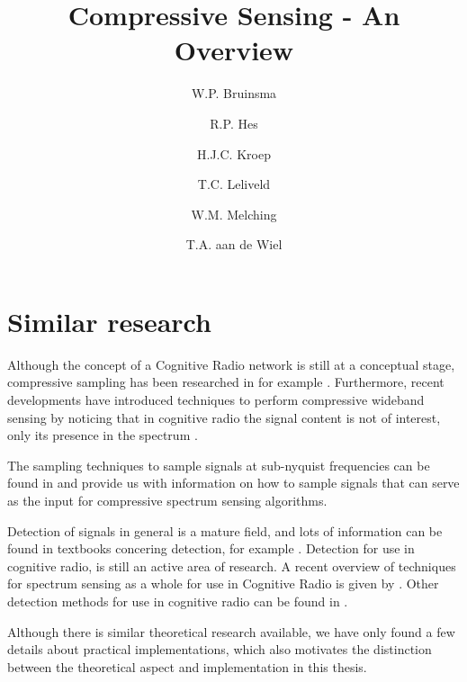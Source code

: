 \documentclass[a4paper, openany, oneside]{memoir}
\title{Compressive Sensing - An Overview}
\author{W.P. Bruinsma \and R.P. Hes \and H.J.C. Kroep \and T.C. Leliveld \and W.M. Melching \and T.A. aan de Wiel}
\begin{document}
\chapter{Similar research}

Although the concept of a Cognitive Radio network is still at a conceptual stage, compressive sampling has been researched in for example 
\cite{candes2007sparsity,candes2006robust,zhang2008theory,candes2008introduction}. Furthermore, recent developments have introduced techniques to perform compressive wideband sensing by noticing that in cognitive radio the signal content is not of interest, only its presence in the spectrum \cite{ariananda2012compressive,ariananda2014cooperative}. 

The sampling techniques to sample signals at sub-nyquist frequencies can be found in \cite{pal2011coprime,ariananda2011multicoset,lexa2011multi} and provide us with information on how to sample signals that can serve as the input for compressive spectrum sensing algorithms.

Detection of signals in general is a mature field, and lots of information can be found in textbooks concering detection, for example \cite{couch2013digital,kay1998fundamentals}. Detection for use in cognitive radio, is still an active area of research. A recent overview of techniques for spectrum sensing as a whole for use in Cognitive Radio is given by \cite{axell2012spectrum}. Other detection methods for use in cognitive radio can be found in \cite{han2013novel,zheng2009spectrum}.

Although there is similar theoretical research available, we have only found a few details about practical implementations, which also motivates the distinction between the theoretical aspect and implementation in this thesis.   
\end{document}
